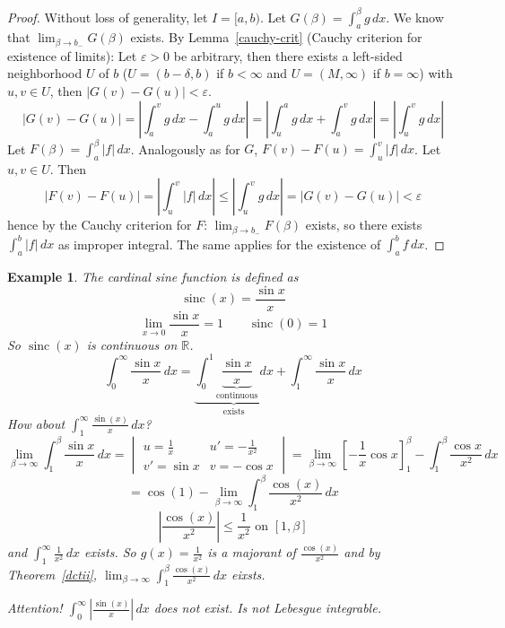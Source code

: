 \documentclass{article}
\newtheorem{example}{Example}  \numberwithin{example}{section}
\newcommand{\card}[1]{\left|#1\right|}
\DeclareMathOperator{\sinc}{sinc}
\begin{document}
\begin{proof}
  Without loss of generality, let $I = [a,b)$.
  Let $G(\beta) = \int_a^\beta g \, dx$. We know that $\lim_{\beta \to b_-} G(\beta)$ exists.
  By Lemma~\ref{cauchy-crit} (Cauchy criterion for existence of limits):
  Let $\varepsilon > 0$ be arbitrary, then there exists a left-sided neighborhood $U$ of $b$
  ($U = (b - \delta, b)$ if $b < \infty$ and $U = (M, \infty)$ if $b = \infty$)
  with $u,v \in U$, then $\card{G(v) - G(u)} < \varepsilon$.
  \[
    \card{G(v) - G(u)} = \card{\int_a^v g \, dx - \int_a^u g \, dx}
      = \card{\int_u^a g \, dx + \int_a^v g \, dx}
      = \card{\int_u^v g \, dx}
  \]
  Let $F(\beta) = \int_a^\beta \card{f} \, dx$.
  Analogously as for $G$, $F(v) - F(u) = \int_u^v \card{f} \, dx$.
  Let $u,v \in U$. Then
  \[
    \card{F(v) - F(u)} = \card{\int_u^v \card{f} \, dx} \leq \card{\int_u^v g \, dx}
      = \card{G(v) - G(u)} < \varepsilon
  \]
  hence by the Cauchy criterion for $F$:
  $\lim_{\beta\to b_-} F(\beta)$ exists, so there exists $\int_a^b \card{f} \, dx$ as improper integral.
  The same applies for the existence of $\int_a^b f \, dx$.
\end{proof}

\begin{example}
  The cardinal sine function is defined as
  \[ \sinc(x) = \frac{\sin{x}}{x} \]
  \[ \lim_{x\to 0} \frac{\sin{x}}{x} = 1 \qquad \sinc(0) = 1 \]
  So $\sinc(x)$ is continuous on $\mathbb R$.
  \[ \int_0^\infty \frac{\sin{x}}{x} \, dx = \underbrace{\int_0^1 \underbrace{\frac{\sin{x}}{x}}_{\text{continuous}} \, dx}_{\text{exists}} + \int_1^\infty \frac{\sin{x}}{x} \, dx \]
  How about $\int_1^\infty \frac{\sin(x)}{x} \, dx$?
  \[
    \lim_{\beta\to\infty} \int_1^\beta \frac{\sin{x}}{x} \, dx =
      \begin{vmatrix}
        u = \frac1x & u' = -\frac1{x^2} \\
        v' = \sin{x} & v = -\cos{x}
      \end{vmatrix}
      = \lim_{\beta\to\infty} \left[
        -\frac1x \cos{x}
      \right]_1^\beta - \int_1^\beta \frac{\cos{x}}{x^2} \, dx
  \] \[
    = \cos(1) - \lim_{\beta\to\infty} \int_1^\beta \frac{\cos(x)}{x^2} \, dx
  \] \[
    \card{\frac{\cos(x)}{x^2}} \leq \frac1{x^2} \text{ on } [1, \beta]
  \]
  and $\int_1^\infty \frac1{x^2} \, dx$ exists.
  So $g(x) = \frac1{x^2}$ is a majorant of $\frac{\cos(x)}{x^2}$ and by Theorem~\ref{dctii},
  $\lim_{\beta\to\infty} \int_1^\beta \frac{\cos(x)}{x^2} \, dx$ eixsts.

  Attention! $\int_0^\infty \card{\frac{\sin(x)}{x}} \, dx$ does not exist. Is not Lebesgue integrable.
\end{example}
\end{document}
